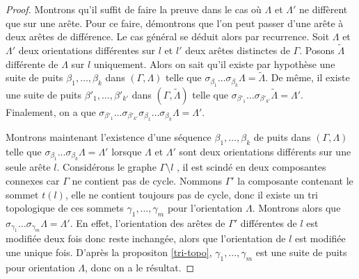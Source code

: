 \documentclass[a4paper,11pt]{article}
\begin{document}
\begin{proof}
  Montrons qu'il suffit de faire la preuve dans le cas où $\Lambda$ et $\Lambda'$ ne diffèrent que sur une arête. Pour ce faire, démontrons que l'on peut passer d'une arête à deux arêtes de différence. Le cas général se déduit alors par recurrence. 
Soit $\Lambda$ et $\Lambda'$ deux orientations différentes sur $l$ et $l'$ deux arêtes distinctes de $\Gamma$. Posons $\widetilde \Lambda$ différente de $\Lambda$ sur $l$ uniquement. Alors on sait qu'il existe par hypothèse une suite de puits $\beta_{1}, \dots, \beta_{k}$ dans $( \Gamma, \Lambda)$ telle que $\sigma_{\beta_{1}}\dots\sigma_{\beta_{k}}\Lambda = \widetilde \Lambda$. De même, il existe une suite de puits $\beta'_{1}, \dots, \beta'_{k'}$ dans $(\Gamma,\widetilde \Lambda)$ telle que $\sigma_{\beta'_{1}}\dots\sigma_{\beta'_{k'}} \widetilde \Lambda = \Lambda'$. Finalement, on a que $\sigma_{\beta'_{1}}\dots\sigma_{\beta'_{k'}}\sigma_{\beta_{1}}\dots\sigma_{\beta_{k}}\Lambda =  \Lambda'$. 

Montrons maintenant l'existence d'une séquence $\beta_{1}, \dots, \beta_{k}$ de puits dans $(\Gamma,\Lambda)$ telle que $\sigma_{\beta_{1}}\dots\sigma_{\beta_{k}}\Lambda = \Lambda'$ lorsque $\Lambda$ et $\Lambda'$ sont deux orientations différents sur une seule arête $l$. Considérons le graphe $\Gamma \setminus l $ , il est scindé en deux composantes connexes car $\Gamma$ ne contient pas de cycle. Nommons $\Gamma'$ la composante contenant le sommet $t(l)$, elle ne contient toujours pas de cycle, donc il existe un tri topologique de ces sommets $\gamma_{1}, \dots, \gamma_{m}$ pour l'orientation $\Lambda$. Montrons alors que $\sigma_{\gamma_{1}}\dots\sigma_{\gamma_{m}} \Lambda = \Lambda'$. En effet, l'orientation des arêtes de $\Gamma'$ différentes de $l$ est modifiée deux fois donc reste inchangée, alors que l'orientation de $l$ est modifiée une unique fois. D'après la propositon \ref{tri-topo}, $\gamma_{1}, \dots, \gamma_{m}$ est une suite de puits pour orientation $\Lambda$, donc on a le résultat.


\end{proof}
\end{document}
